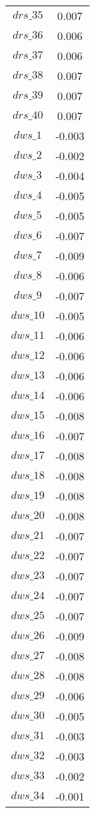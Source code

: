 \begin{center}
\begin{longtable}{cc}
$drs\_35$ 	 & 	 0.007 \\
$drs\_36$ 	 & 	 0.006 \\
$drs\_37$ 	 & 	 0.006 \\
$drs\_38$ 	 & 	 0.007 \\
$drs\_39$ 	 & 	 0.007 \\
$drs\_40$ 	 & 	 0.007 \\
$dws\_1$ 	 & 	 -0.003 \\
$dws\_2$ 	 & 	 -0.002 \\
$dws\_3$ 	 & 	 -0.004 \\
$dws\_4$ 	 & 	 -0.005 \\
$dws\_5$ 	 & 	 -0.005 \\
$dws\_6$ 	 & 	 -0.007 \\
$dws\_7$ 	 & 	 -0.009 \\
$dws\_8$ 	 & 	 -0.006 \\
$dws\_9$ 	 & 	 -0.007 \\
$dws\_10$ 	 & 	 -0.005 \\
$dws\_11$ 	 & 	 -0.006 \\
$dws\_12$ 	 & 	 -0.006 \\
$dws\_13$ 	 & 	 -0.006 \\
$dws\_14$ 	 & 	 -0.006 \\
$dws\_15$ 	 & 	 -0.008 \\
$dws\_16$ 	 & 	 -0.007 \\
$dws\_17$ 	 & 	 -0.008 \\
$dws\_18$ 	 & 	 -0.008 \\
$dws\_19$ 	 & 	 -0.008 \\
$dws\_20$ 	 & 	 -0.008 \\
$dws\_21$ 	 & 	 -0.007 \\
$dws\_22$ 	 & 	 -0.007 \\
$dws\_23$ 	 & 	 -0.007 \\
$dws\_24$ 	 & 	 -0.007 \\
$dws\_25$ 	 & 	 -0.007 \\
$dws\_26$ 	 & 	 -0.009 \\
$dws\_27$ 	 & 	 -0.008 \\
$dws\_28$ 	 & 	 -0.008 \\
$dws\_29$ 	 & 	 -0.006 \\
$dws\_30$ 	 & 	 -0.005 \\
$dws\_31$ 	 & 	 -0.003 \\
$dws\_32$ 	 & 	 -0.003 \\
$dws\_33$ 	 & 	 -0.002 \\
$dws\_34$ 	 & 	 -0.001 \\

\end{longtable}
\end{center}
